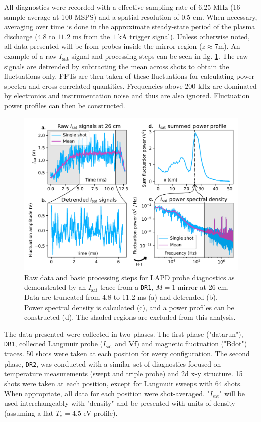 All diagnostics were recorded with a effective sampling rate of 6.25 MHz (16-sample average at 100 MSPS) and a spatial resolution of 0.5 cm. When necessary, averaging over time is done in the approximate steady-state period of the plasma discharge ($4.8$ to $11.2$ ms from the $1$ kA trigger signal). Unless otherwise noted, all data presented will be from probes inside the mirror region ($z \approx 7$m). An example of a raw $I_\text{sat}$ signal and processing steps can be seen in fig. \ref{fig:raw-signals-plots}. The raw signals are detrended by subtracting the mean across shots to obtain the fluctuations only. FFTs are then taken of these fluctuations for calculating power spectra and cross-correlated quantities. Frequencies above 200 kHz are dominated by electronics and instrumentation noise and thus are also ignored. Fluctuation power profiles can then be constructed.

\begin{figure}
    \centering
    \includegraphics[width=\textwidth]{figures/fig2.pdf}
    \caption[Raw data processing steps]{Raw data and basic processing steps for LAPD probe diagnostics as demonstrated by an $I_\text{sat}$ trace from a \texttt{DR1}, $M=1$ mirror at 26 cm. Data are truncated from 4.8 to 11.2 ms (a) and detrended (b). Power spectral density is calculated (c), and a power profiles can be constructed (d). The shaded regions are excluded from this analysis.}
    \label{fig:raw-signals-plots}
\end{figure}

The data presented were collected in two phases. The first phase ("datarun"), \texttt{DR1}, collected Langmuir probe ($I_\text{sat}$ and Vf) and magnetic fluctuation ("Bdot") \cite{Everson_design_2009} traces. 50 shots were taken at each position for every configuration. 
The second phase, \texttt{DR2}, was conducted with a similar set of diagnostics focused on temperature measurements (swept and triple probe) and 2d x-y structure. 15 shots were taken at each position, except for Langmuir sweeps with 64 shots. When appropriate, all data for each position were shot-averaged.
"$I_\text{sat}$" will be used interchangeably with "density" and be presented with units of density (assuming a flat $T_e = 4.5$ eV profile).

